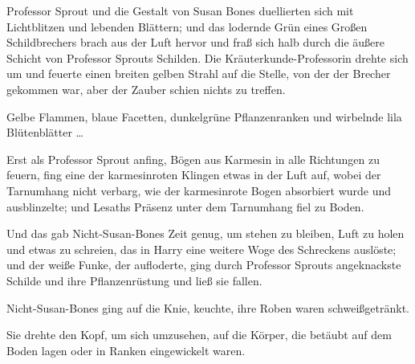 Professor Sprout und die Gestalt von Susan Bones duellierten sich mit Lichtblitzen und lebenden Blättern; und das lodernde Grün eines Großen Schildbrechers brach aus der Luft hervor und fraß sich halb durch die äußere Schicht von Professor Sprouts Schilden. Die Kräuterkunde-Professorin drehte sich um und feuerte einen breiten gelben Strahl auf die Stelle, von der der Brecher gekommen war, aber der Zauber schien nichts zu treffen.

Gelbe Flammen, blaue Facetten, dunkelgrüne Pflanzenranken und wirbelnde lila Blütenblätter …

Erst als Professor Sprout anfing, Bögen aus Karmesin in alle Richtungen zu feuern, fing eine der karmesinroten Klingen etwas in der Luft auf, wobei der Tarnumhang nicht verbarg, wie der karmesinrote Bogen absorbiert wurde und ausblinzelte; und Lesaths Präsenz unter dem Tarnumhang fiel zu Boden.

Und das gab Nicht-Susan-Bones Zeit genug, um stehen zu bleiben, Luft zu holen und etwas zu schreien, das in Harry eine weitere Woge des Schreckens auslöste; und der weiße Funke, der aufloderte, ging durch Professor Sprouts angeknackste Schilde und ihre Pflanzenrüstung und ließ sie fallen.

Nicht-Susan-Bones ging auf die Knie, keuchte, ihre Roben waren schweißgetränkt.

Sie drehte den Kopf, um sich umzusehen, auf die Körper, die betäubt auf dem Boden lagen oder in Ranken eingewickelt waren.

